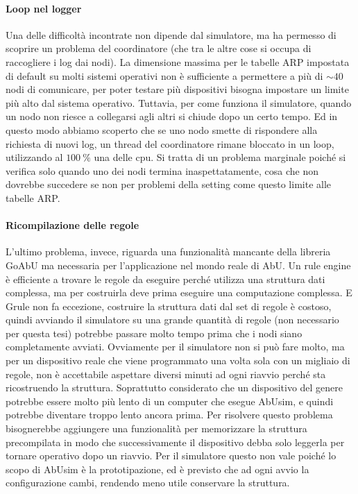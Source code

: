 \documentclass[target=bach]{thud}
\begin{document}
\paragraph{Loop nel logger}

Una delle difficoltà incontrate non dipende dal simulatore, ma ha permesso di scoprire un problema del coordinatore (che tra le altre cose si occupa di raccogliere i log dai nodi).
La dimensione massima per le tabelle ARP impostata di default su molti sistemi operativi non è sufficiente a permettere a più di $\sim40$ nodi di comunicare, per poter testare più dispositivi bisogna impostare un limite più alto dal sistema operativo. Tuttavia, per come funziona il simulatore, quando un nodo non riesce a collegarsi agli altri si chiude dopo un certo tempo.
Ed in questo modo abbiamo scoperto che se uno nodo smette di rispondere alla richiesta di nuovi log, un thread del coordinatore rimane bloccato in un loop, utilizzando al $\qty{100}{\percent}$ una delle cpu.
Si tratta di un problema marginale poiché si verifica solo quando uno dei nodi termina inaspettatamente, cosa che non dovrebbe succedere se non per problemi della setting come questo limite alle tabelle ARP.

\paragraph{Ricompilazione delle regole}\label{ricompilazione}

L'ultimo problema, invece, riguarda una funzionalità mancante della libreria GoAbU ma necessaria per l'applicazione nel mondo reale di AbU.
Un rule engine è efficiente a trovare le regole da eseguire perché utilizza una struttura dati complessa, ma per costruirla deve prima eseguire una computazione complessa. E Grule non fa eccezione, costruire la struttura dati dal set di regole è costoso, quindi avviando il simulatore su una grande quantità di regole (non necessario per questa tesi) potrebbe passare molto tempo prima che i nodi siano completamente avviati.
Ovviamente per il simulatore non si può fare molto, ma per un dispositivo reale che viene programmato una volta sola con un migliaio di regole, non è accettabile aspettare diversi minuti ad ogni riavvio perché sta ricostruendo la struttura. Soprattutto considerato che un dispositivo del genere potrebbe essere molto più lento di un computer che esegue AbUsim, e quindi potrebbe diventare troppo lento ancora prima.
Per risolvere questo problema bisognerebbe aggiungere una funzionalità per memorizzare la struttura precompilata in modo che successivamente il dispositivo debba solo leggerla per tornare operativo dopo un riavvio. Per il simulatore questo non vale poiché lo scopo di AbUsim è la prototipazione, ed è previsto che ad ogni avvio la configurazione cambi, rendendo meno utile conservare la struttura.
\end{document}
